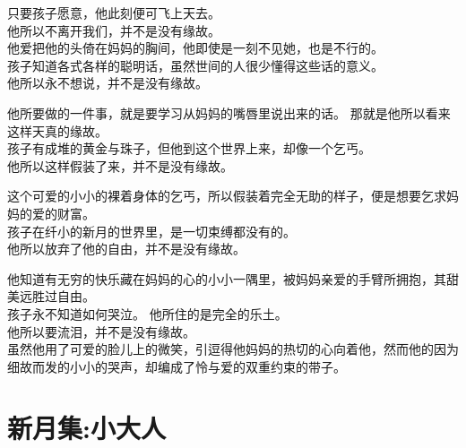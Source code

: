 \documentclass[
]{book}
\renewenvironment{quote}{\begin{VF}}{\end{VF}}
\begin{document}
\begin{quote}
只要孩子愿意，他此刻便可飞上天去。\\
他所以不离开我们，并不是没有缘故。\\
他爱把他的头倚在妈妈的胸间，他即使是一刻不见她，也是不行的。\\
孩子知道各式各样的聪明话，虽然世间的人很少懂得这些话的意义。\\
他所以永不想说，并不是没有缘故。

他所要做的一件事，就是要学习从妈妈的嘴唇里说出来的话。 那就是他所以看来这样天真的缘故。\\
孩子有成堆的黄金与珠子，但他到这个世界上来，却像一个乞丐。\\
他所以这样假装了来，并不是没有缘故。

这个可爱的小小的裸着身体的乞丐，所以假装着完全无助的样子，便是想要乞求妈妈的爱的财富。\\
孩子在纤小的新月的世界里，是一切束缚都没有的。\\
他所以放弃了他的自由，并不是没有缘故。

他知道有无穷的快乐藏在妈妈的心的小小一隅里，被妈妈亲爱的手臂所拥抱，其甜美远胜过自由。\\
孩子永不知道如何哭泣。 他所住的是完全的乐土。\\
他所以要流泪，并不是没有缘故。\\
虽然他用了可爱的脸儿上的微笑，引逗得他妈妈的热切的心向着他，然而他的因为细故而发的小小的哭声，却编成了怜与爱的双重约束的带子。
\end{quote}

\hypertarget{section-35}{%
\section{新月集:小大人}\label{section-35}}
\end{document}
